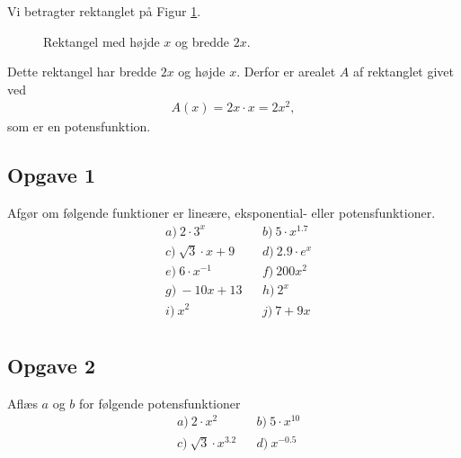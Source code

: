 \begin{exa}
	Vi betragter rektanglet på Figur \ref{fig:rektangel}.
	\begin{figure}[H]
		\centering
		\caption{Rektangel med højde $x$ og bredde $2x$.}
		\label{fig:rektangel}
	\end{figure}
	Dette rektangel har bredde $2x$ og højde $x$. Derfor er arealet $A$ af rektanglet givet ved
	\begin{align*}
		A(x) = 2x\cdot x = 2x^2,
	\end{align*}
	som er en potensfunktion.
\end{exa}


\subsection*{Opgave 1}

Afgør om følgende funktioner er lineære, eksponential- eller potensfunktioner. 
\begin{align*}
	&a) \ 2\cdot 3^x  &&b) \ 5\cdot x^{1.7}  \\
	&c) \ \sqrt{3}\cdot x + 9 &&d) \ 2.9\cdot e^x  \\
	&e) \ 6\cdot x^{-1} &&f) \ 200x^2  \\
	&g) \ -10x + 13 &&h) \ 2^x \\
	&i) \ x^2  &&j) \ 7+ 9x  \\
\end{align*}

\subsection*{Opgave 2}

Aflæs $a$ og $b$ for følgende potensfunktioner
\begin{align*}
	&a) \ 2\cdot x^2  &&b) \ 5\cdot x^{10} \\
	&c) \ \sqrt{3}\cdot x^{3.2} &&d) \ x^{-0.5}  \\
\end{align*}


